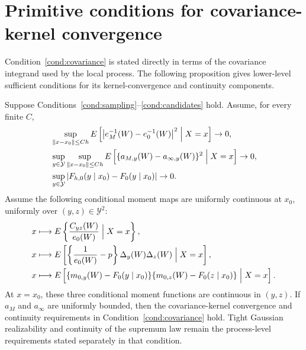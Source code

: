 \section{Primitive conditions for covariance-kernel convergence}
\label{sec:supp-primitive-covariance}

Condition~\ref{cond:covariance} is stated directly in terms of the covariance integrand used by the local process. The following proposition gives lower-level sufficient conditions for its kernel-convergence and continuity components.

\begin{proposition}
\label{prop:primitive-covariance}
Suppose Conditions~\ref{cond:sampling}--\ref{cond:candidates} hold. Assume, for every finite \(C\),
\begin{align}
&\sup_{\|x-x_0\|\le Ch}
E\left[
\left|e_M^{-1}(W)-e_0^{-1}(W)\right|^2
\Bigm|X=x
\right]
\to0,
\label{eq:primitive-e-convergence}\\
&\sup_{y\in\mathcal Y}\sup_{\|x-x_0\|\le Ch}
E\left[
\{a_{M,y}(W)-a_{\infty,y}(W)\}^2
\Bigm|X=x
\right]
\to0,
\label{eq:primitive-path-convergence}\\
&\sup_{y\in\mathcal Y}|F_{h,0}(y\mid x_0)-F_0(y\mid x_0)|
\to0.
\label{eq:primitive-target-convergence}
\end{align}
Assume the following conditional moment maps are uniformly continuous at \(x_0\), uniformly over \((y,z)\in\mathcal Y^2\):
\begin{align*}
x&\longmapsto
E\left\{\frac{C_{yz}(W)}{e_0(W)}\Bigm|X=x\right\},\\
x&\longmapsto
E\left[
\left\{\frac1{e_0(W)}-p\right\}
\Delta_y(W)\Delta_z(W)
\Bigm|X=x
\right],\\
x&\longmapsto
E\left[\{m_{0,y}(W)-F_0(y\mid x_0)\}
          \{m_{0,z}(W)-F_0(z\mid x_0)\}\Bigm|X=x\right].
\end{align*}
At \(x=x_0\), these three conditional moment functions are continuous in \((y,z)\). If \(a_M\) and \(a_\infty\) are uniformly bounded, then the covariance-kernel convergence and continuity requirements in Condition~\ref{cond:covariance} hold. Tight Gaussian realizability and continuity of the supremum law remain the process-level requirements stated separately in that condition.
\end{proposition}

